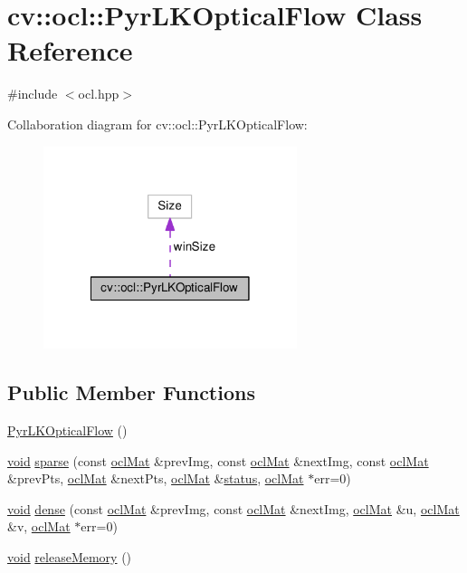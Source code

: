 \hypertarget{classcv_1_1ocl_1_1PyrLKOpticalFlow}{\section{cv\-:\-:ocl\-:\-:Pyr\-L\-K\-Optical\-Flow Class Reference}
\label{classcv_1_1ocl_1_1PyrLKOpticalFlow}
}


{\ttfamily \#include $<$ocl.\-hpp$>$}



Collaboration diagram for cv\-:\-:ocl\-:\-:Pyr\-L\-K\-Optical\-Flow\-:\nopagebreak
\begin{figure}[H]
\begin{center}
\leavevmode
\includegraphics[width=210pt]{classcv_1_1ocl_1_1PyrLKOpticalFlow__coll__graph}
\end{center}
\end{figure}
\subsection*{Public Member Functions}
\begin{DoxyCompactItemize}
\item 
\hyperlink{classcv_1_1ocl_1_1PyrLKOpticalFlow_a81e169c81058de9087803143c14f16c0}{Pyr\-L\-K\-Optical\-Flow} ()
\item 
\hyperlink{legacy_8hpp_a8bb47f092d473522721002c86c13b94e}{void} \hyperlink{classcv_1_1ocl_1_1PyrLKOpticalFlow_a3563f40b857a74a8989a700da40dc25d}{sparse} (const \hyperlink{classcv_1_1ocl_1_1oclMat}{ocl\-Mat} \&prev\-Img, const \hyperlink{classcv_1_1ocl_1_1oclMat}{ocl\-Mat} \&next\-Img, const \hyperlink{classcv_1_1ocl_1_1oclMat}{ocl\-Mat} \&prev\-Pts, \hyperlink{classcv_1_1ocl_1_1oclMat}{ocl\-Mat} \&next\-Pts, \hyperlink{classcv_1_1ocl_1_1oclMat}{ocl\-Mat} \&\hyperlink{tracking_8hpp_ae17b3c2584dab511e91d1c96644018bf}{status}, \hyperlink{classcv_1_1ocl_1_1oclMat}{ocl\-Mat} $\ast$err=0)
\item 
\hyperlink{legacy_8hpp_a8bb47f092d473522721002c86c13b94e}{void} \hyperlink{classcv_1_1ocl_1_1PyrLKOpticalFlow_ae25db40fdf3f1b7c363c31fa735ab75f}{dense} (const \hyperlink{classcv_1_1ocl_1_1oclMat}{ocl\-Mat} \&prev\-Img, const \hyperlink{classcv_1_1ocl_1_1oclMat}{ocl\-Mat} \&next\-Img, \hyperlink{classcv_1_1ocl_1_1oclMat}{ocl\-Mat} \&u, \hyperlink{classcv_1_1ocl_1_1oclMat}{ocl\-Mat} \&v, \hyperlink{classcv_1_1ocl_1_1oclMat}{ocl\-Mat} $\ast$err=0)
\item 
\hyperlink{legacy_8hpp_a8bb47f092d473522721002c86c13b94e}{void} \hyperlink{classcv_1_1ocl_1_1PyrLKOpticalFlow_a4ed556b879af77d5e378fa2bf22d641f}{release\-Memory} ()
\end{DoxyCompactItemize}
